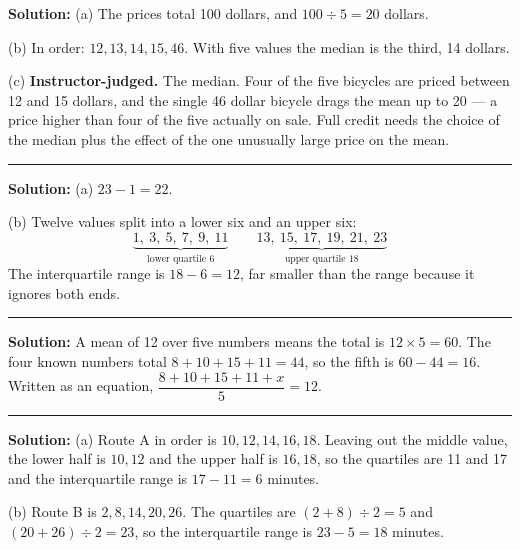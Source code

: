 \documentclass[12pt]{article}
\begin{document}
\textbf{Solution:} (a) The prices total 100 dollars, and $100 \div 5 = 20$
dollars. 

(b) In order: $12, 13, 14, 15, 46$. With five values the median is the third,
14 dollars. 

(c) \textbf{Instructor-judged.} The median. Four of the five bicycles are priced
between 12 and 15 dollars, and the single 46 dollar bicycle drags the mean up to
20 --- a price higher than four of the five actually on sale. Full credit needs
the choice of the median plus the effect of the one unusually large price on the
mean.

\vspace{0.22cm}\noindent\rule{\linewidth}{0.2pt}\vspace{0.22cm}


\textbf{Solution:} (a) $23 - 1 = 22$. 

(b) Twelve values split into a lower six and an upper six:
\[
  \underbrace{1,\ 3,\ 5,\ 7,\ 9,\ 11}_{\text{lower quartile } 6}
  \qquad
  \underbrace{13,\ 15,\ 17,\ 19,\ 21,\ 23}_{\text{upper quartile } 18}
\]
The interquartile range is $18 - 6 = 12$, far smaller than the range because it
ignores both ends. 

\vspace{0.22cm}\noindent\rule{\linewidth}{0.2pt}\vspace{0.22cm}


\textbf{Solution:} A mean of 12 over five numbers means the total is
$12 \times 5 = 60$. The four known numbers total $8 + 10 + 15 + 11 = 44$, so the
fifth is $60 - 44 = 16$. Written as an equation,
$\dfrac{8 + 10 + 15 + 11 + x}{5} = 12$. 

\vspace{0.22cm}\noindent\rule{\linewidth}{0.2pt}\vspace{0.22cm}


\textbf{Solution:} (a) Route A in order is $10, 12, 14, 16, 18$. Leaving out the
middle value, the lower half is $10, 12$ and the upper half is $16, 18$, so the
quartiles are 11 and 17 and the interquartile range is $17 - 11 = 6$
minutes. 

(b) Route B is $2, 8, 14, 20, 26$. The quartiles are $(2 + 8) \div 2 = 5$ and
$(20 + 26) \div 2 = 23$, so the interquartile range is $23 - 5 = 18$
minutes. 
\end{document}
